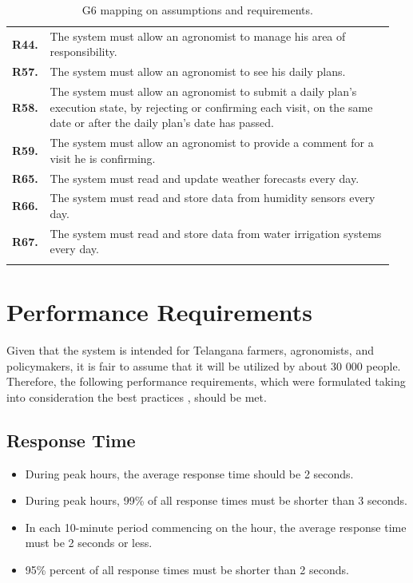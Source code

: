 \begin{longtable}{p{0.07\linewidth} p{0.88\linewidth}}
	\textbf{R44.} & The system must allow an agronomist to manage his area of responsibility.\\
	\textbf{R57.} & The system must allow an agronomist to see his daily plans.\\
	\textbf{R58.} & The system must allow an agronomist to submit a daily plan's execution state, by rejecting or confirming each visit, on the same date or after the daily plan's date has passed. \\
	\textbf{R59.} & The system must allow an agronomist to provide a comment for a visit he is confirming.\\
	
	\textbf{R65.} & The system must read and update weather forecasts every day. \\
	\textbf{R66.} & The system must read and store data from humidity sensors every day. \\
	\textbf{R67.} & The system must read and store data from water irrigation systems every day. \\
    \bottomrule
    \caption{G6 mapping on assumptions and requirements.}
\end{longtable}

\section{Performance Requirements} \label{sec:performance_requirements}

Given that the system is intended for Telangana farmers, agronomists, and policymakers, it is fair to assume that it will be utilized by about 30 000 people. Therefore, the following performance requirements, which were formulated taking into consideration the best practices \cite{performance_requirements}, should be met.

\subsection{Response Time}

\begin{itemize}
    \item During peak hours, the average response time should be 2 seconds.
    \item During peak hours, 99\% of all response times must be shorter than 3 seconds.
    \item In each 10-minute period commencing on the hour, the average response time must be 2 seconds or less.
    \item 95\% percent of all response times must be shorter than 2 seconds.
\end{itemize}
 
